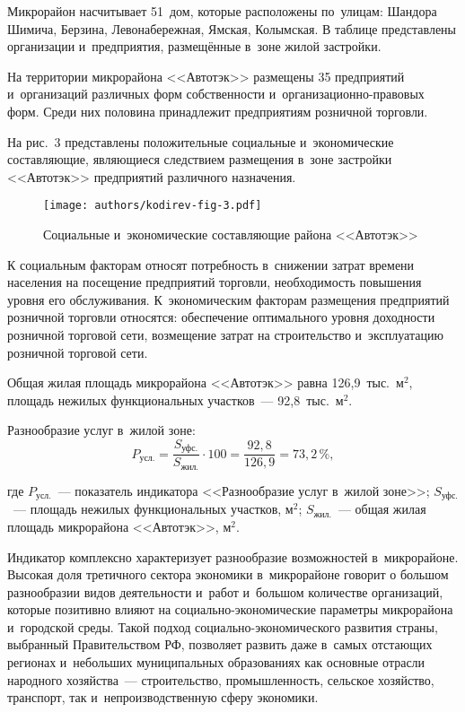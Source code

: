 

Микрорайон насчитывает 51~дом, которые расположены по~улицам: Шандора Шимича, Берзина, Левонабережная, Ямская, Колымская. В таблице представлены организации и~предприятия, размещённые в~зоне жилой застройки.



На территории микрорайона <<Автотэк>> размещены 35 предприятий и~организаций различных форм собственности и~организационно-правовых форм. Среди них половина принадлежит предприятиям розничной торговли.

На рис.~3 представлены положительные социальные и~экономические составляющие, являющиеся следствием размещения в~зоне застройки <<Автотэк>> предприятий различного назначения.\enlargethispage{\baselineskip}

\begin{figure}[]
  \centering
  \texttt{[image: authors/kodirev-fig-3.pdf]}  \vspace{-20pt}
  \caption{Социальные и~экономические составляющие района <<Автотэк>>}
  \label{fig:kodirev-fig-3}
  \vspace{-8pt}
\end{figure}

К социальным факторам относят потребность в~снижении затрат времени населения на посещение предприятий торговли, необходимость повышения уровня его обслуживания. К~экономическим факторам размещения предприятий розничной торговли относятся: обеспечение оптимального уровня доходности розничной торговой сети, возмещение затрат на строительство и~эксплуатацию розничной торговой сети.

Общая жилая площадь микрорайона <<Автотэк>> равна 126,9~тыс.~м$^2$, площадь нежилых функциональных участков~--- 92,8~тыс.~м$^2$.


Разнообразие услуг в~жилой зоне:\enlargethispage{\baselineskip}
  \vspace{-8pt}
$$ P_{\text{усл.}} = \frac{S_{\text{уфс.}}}{S_{\text{жил.}}}\cdot100 = \frac{92,8}{126,9} = 73,2\,\%,$$

\hspace{-0.5cm}где $P_{\text{усл.}}$~--- показатель индикатора <<Разнообразие услуг в~жилой зоне>>;
$S_{\text{уфс.}}$~--- площадь нежилых функциональных участков, м$^2$;
$S_{\text{жил.}}$~--- общая жилая площадь микрорайона <<Автотэк>>, м$^2$.

Индикатор комплексно характеризует разнообразие возможностей в~микрорайоне. Высокая доля третичного сектора экономики в~микрорайоне говорит о большом разнообразии видов деятельности и~работ и~большом количестве организаций, которые позитивно влияют на социально-экономические параметры микрорайона и~городской среды. Такой подход социально-экономического развития страны, выбранный Правительством РФ, позволяет развить даже в~самых отстающих регионах и~небольших муниципальных образованиях как основные отрасли народного хозяйства~--- строительство, промышленность, сельское хозяйство, транспорт, так и~непроизводственную сферу экономики.

